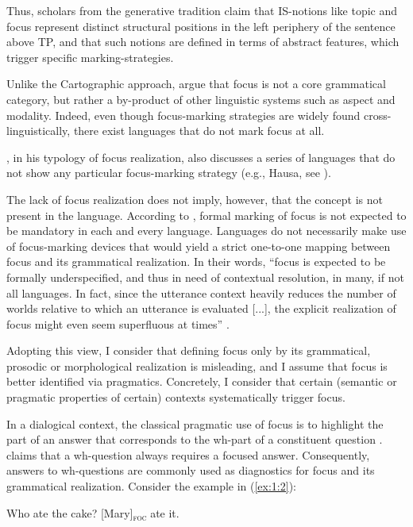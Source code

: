 Thus, scholars from the generative tradition claim that IS-notions like topic and focus represent distinct structural positions in the left periphery of the sentence above TP, and that such notions are defined in terms of abstract features, which trigger specific marking-strategies.

Unlike the Cartographic approach, \textcite{matic2013meanings} argue that focus is not a core grammatical category, but rather a by-product of other linguistic systems such as aspect and modality. Indeed, even though focus-marking strategies are widely found cross-linguistically, there exist languages that do not mark focus at all.

\textcite{buring2009towards}, in his typology of focus realization, also discusses a series of languages that do not show any particular focus-marking strategy (e.g., Hausa, see \cite{green2003ex, hartmann2008focus}). 

The lack of focus realization does not imply, however, that the concept is not present in the language.
According to \textcite{zimmermann2011focus}, formal marking of focus is not expected to be mandatory in each and every language. Languages do not necessarily make use of focus-marking devices that would yield a strict one-to-one mapping between focus and its grammatical realization. In their words, ``focus is expected to be formally underspecified, and thus in need of contextual resolution, in many, if not all languages. In fact, since the utterance context heavily reduces the number of worlds relative to which an utterance is evaluated [...], the explicit realization of focus might even seem superfluous at times” \parencite[1658]{zimmermann2011focus}.

Adopting this view, I consider that defining focus only by its grammatical, prosodic or morphological realization is misleading, and I assume that focus is better identified via pragmatics. Concretely, I consider that certain (semantic or pragmatic properties of certain) contexts systematically trigger focus.

In a dialogical context, the classical pragmatic use of focus is to highlight the part of an answer that corresponds to the wh-part of a constituent question \parencite{paul2010prinzipien}. \textcite{drubig2003toward} claims that a wh-question always requires a focused answer. Consequently, answers to wh-questions are commonly used as diagnostics for focus and its grammatical realization. Consider the example in (\ref{ex:1:2}):

\ea \label{ex:1:2}
\ea Who ate the cake? 
\ex{} [Mary]\textsubscript{\textsc{foc}} \normalsize ate it.
\z \z

